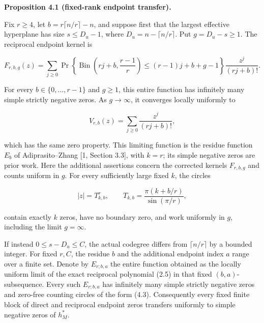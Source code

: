 \documentclass[10pt]{article}
\newenvironment{mdstatement}[1]
  {\par\Needspace{0.16\textheight}\noindent\textbf{#1.}\ \itshape}
  {\par\normalfont}
\begin{document}
\begin{mdstatement}{Proposition 4.1 (fixed-rank endpoint transfer)}


Fix $r\ge4$, let $b=r\lceil n/r\rceil-n$, and suppose first that the
largest effective hyperplane has size $s\le D_u-1$, where
$D_u=n-\lceil n/r\rceil$.  Put $g=D_u-s\ge1$.  The reciprocal endpoint
kernel is

\[
 F_{r,b,g}(z)=\sum_{j\ge0}
 \Pr\!\left\{\operatorname{Bin}
   \left(rj+b,\frac{r-1}{r}\right)
   \le(r-1)j+b+g-1\right\}\frac{z^j}{(rj+b)!}. \tag{4.1}
\]

For every $b\in\{0,\ldots,r-1\}$ and $g\ge1$, this entire function has
infinitely many simple strictly negative zeros.  As $g\to\infty$, it
converges locally uniformly to

\[
 V_{r,b}(z)=\sum_{j\ge0}\frac{z^j}{(rj+b)!}, \tag{4.2}
\]

which has the same zero property.  This limiting function is the residue
function $E_b$ of Adiprasito--Zhang [1, Section 3.3], with $k=r$; its
simple negative zeros are prior work.  Here the additional assertions concern
the corrected kernels $F_{r,b,g}$ and counts uniform in $g$.
For every sufficiently large fixed $k$,
the circles

\[
 |z|=T_{k,b}^r,
 \qquad T_{k,b}=\frac{\pi(k+b/r)}{\sin(\pi/r)}, \tag{4.3}
\]

contain exactly $k$ zeros, have no boundary zero, and work uniformly in
$g$, including the limit $g=\infty$.

If instead $0\le s-D_u\le C$, the actual codegree differs from
$\lceil n/r\rceil$ by a bounded integer.  For fixed $r,C$, the residue
$b$ and the additional endpoint index $a$ range over a finite set.  Denote
by $E_{r;b,a}$ the entire function obtained as the locally uniform limit of
the exact reciprocal polynomial (2.5) in that fixed $(b,a)$-subsequence.
Every such $E_{r;b,a}$ has infinitely many simple strictly negative zeros
and zero-free counting circles of the form (4.3).  Consequently every fixed
finite block of direct and reciprocal endpoint zeros transfers uniformly to
simple negative zeros of $h_M^*$.

\end{mdstatement}
\end{document}
